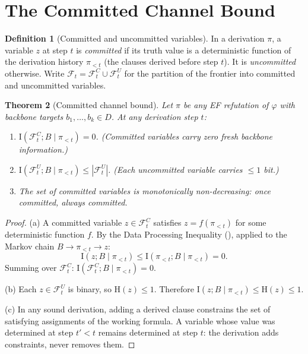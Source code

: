 \documentclass[11pt]{article}
\newtheorem{theorem}{Theorem}[section]
\theoremstyle{definition}
\newtheorem{definition}[theorem]{Definition}
\newcommand{\MI}{\mathrm{I}}
\newcommand{\Ent}{\mathrm{H}}
\newcommand{\frontier}{\mathcal{F}}
\begin{document}
\section{The Committed Channel Bound}\label{sec:dpi}

\begin{definition}[Committed and uncommitted variables]\label{def:committed}
In a derivation $\pi$, a variable $z$ at step $t$ is \emph{committed}
if its truth value is a deterministic function of the derivation history
$\pi_{<t}$ (the clauses derived before step $t$).  It is
\emph{uncommitted} otherwise.  Write
$\frontier_t = \frontier_t^C \cup \frontier_t^U$ for the partition of
the frontier into committed and uncommitted variables.
\end{definition}

\begin{theorem}[Committed channel bound]\label{thm:committed}
Let $\pi$ be any EF refutation of $\varphi$ with backbone targets
$b_1, \ldots, b_k \in D$.  At any derivation step $t$:
\begin{enumerate}[label=(\alph*)]
\item $\MI(\frontier_t^C; B \mid \pi_{<t}) = 0$.  (Committed variables
carry zero fresh backbone information.)
\item $\MI(\frontier_t^U; B \mid \pi_{<t}) \leq |\frontier_t^U|$.
(Each uncommitted variable carries $\leq 1$ bit.)
\item The set of committed variables is monotonically non-decreasing:
once committed, always committed.
\end{enumerate}
\end{theorem}

\begin{proof}
(a) A committed variable $z \in \frontier_t^C$ satisfies
$z = f(\pi_{<t})$ for some deterministic function $f$.  By the Data
Processing Inequality (), applied to the Markov chain
$B \to \pi_{<t} \to z$:
\[
\MI(z; B \mid \pi_{<t}) \leq \MI(\pi_{<t}; B \mid \pi_{<t}) = 0.
\]
Summing over $\frontier_t^C$:
$\MI(\frontier_t^C; B \mid \pi_{<t}) = 0$.

(b) Each $z \in \frontier_t^U$ is binary, so $\Ent(z) \leq 1$.
Therefore $\MI(z; B \mid \pi_{<t}) \leq \Ent(z) \leq 1$.

(c) In any sound derivation, adding a derived clause constrains the
set of satisfying assignments of the working formula.  A variable whose
value was determined at step $t' < t$ remains determined at step $t$:
the derivation adds constraints, never removes them.
\end{proof}
\end{document}
